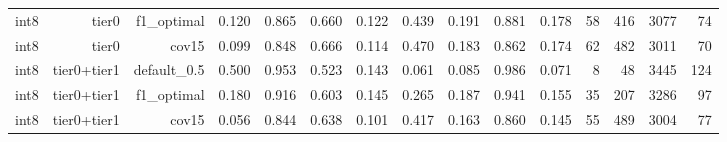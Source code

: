 \begin{table}[t]
{\begin{tabular}{lrrrrrrrrrrrrrr}
int8 & tier0 & f1\_optimal & 0.120 & 0.865 & 0.660 & 0.122 & 0.439 & 0.191 & 0.881 & 0.178 & 58 & 416 & 3077 & 74 \\
int8 & tier0 & cov15 & 0.099 & 0.848 & 0.666 & 0.114 & 0.470 & 0.183 & 0.862 & 0.174 & 62 & 482 & 3011 & 70 \\
int8 & tier0+tier1 & default\_0.5 & 0.500 & 0.953 & 0.523 & 0.143 & 0.061 & 0.085 & 0.986 & 0.071 & 8 & 48 & 3445 & 124 \\
int8 & tier0+tier1 & f1\_optimal & 0.180 & 0.916 & 0.603 & 0.145 & 0.265 & 0.187 & 0.941 & 0.155 & 35 & 207 & 3286 & 97 \\
int8 & tier0+tier1 & cov15 & 0.056 & 0.844 & 0.638 & 0.101 & 0.417 & 0.163 & 0.860 & 0.145 & 55 & 489 & 3004 & 77 \\
\bottomrule
\end{tabular}
}
\end{table}
